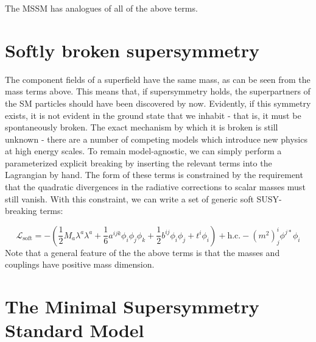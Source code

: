 The MSSM has analogues of all of the above terms.

\section{Softly broken supersymmetry}
The component fields of a superfield have the same mass, as can be seen from the mass terms above. This means that, if supersymmetry holds, the superpartners of the SM particles should have been discovered by now. Evidently, if this symmetry exists, it is not evident in the ground state that we inhabit - that is, it must be spontaneously broken. The exact mechanism by which it is broken is still unknown - there are a number of competing models which introduce new physics at high energy scales. To remain model-agnostic, we can simply perform a parameterized explicit breaking by inserting the relevant terms into the Lagrangian by hand. The form of these terms is constrained by the requirement that the quadratic divergences in the radiative corrections to scalar masses must still vanish. With this constraint, we can write a set of generic soft SUSY-breaking terms:

\[\mathcal{L}_\text{soft} = -\left(\frac{1}{2}M_a\lambda^a\lambda^a+\frac{1}{6}a^{ijk}\phi_i\phi_j\phi_k+\frac{1}{2}b^{ij}\phi_i\phi_j+t^i\phi_i\right)+\text{h.c.}-(m^2)_j^i\phi^{j*}\phi_i\]
Note that a general feature of the the above terms is that the masses and couplings have positive mass dimension.

\section{The Minimal Supersymmetry Standard Model}

